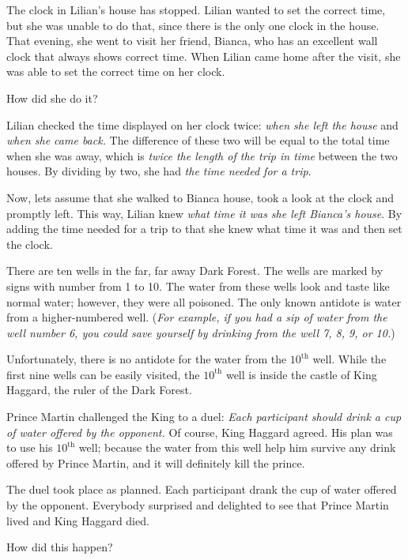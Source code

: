 \documentclass{article}
\begin{document}
\begin{example*}
    \label{example:pi-2022-4-p3}
    The clock in Lilian's house has stopped. Lilian wanted to set the correct time,
    but she was unable to do that, since there is the only one clock in the house.
    That evening, she went to visit her friend, Bianca,
    who has an excellent wall clock that always shows correct time.
    When Lilian came home after the visit, she was able to set the correct time on her clock.

    How did she do it?
\end{example*}

\begin{soln} 
    Lilian checked the time displayed on her clock twice: \textit{when she left the house} and \textit{when she came back.}
    The difference of these two will be equal to the total time when she was away,
    which is \textit{twice the length of the trip in time} between the two houses.
    By dividing by two, she had \textit{the time needed for a trip}. 

    Now, lets assume that she walked to Bianca house, took a look at the clock and promptly left.
    This way, Lilian knew \textit{what time it was she left Bianca's house}.
    By adding the time needed for a trip to that she knew what time it was and then set the clock.
\end{soln}

\begin{example*}
    \label{example:pi-2022-4-p4}
    There are ten wells in the far, far away Dark Forest.
    The wells are marked by signs with number from 1 to 10.
    The water from these wells look and taste like normal water;
    however, they were all poisoned.
    The only known antidote is water from a higher-numbered well.
    (\textit{For example, if you had a sip of water from the well number 6,
    you could save yourself by drinking from the well 7, 8, 9, or 10.})

    Unfortunately, there is no antidote for the water from the $10^{\text{th}}$ well.
    While the first nine wells can be easily visited,
    the $10^{\text{th}}$ well is inside the castle of King Haggard, the ruler of the Dark Forest.
    
    Prince Martin challenged the King to a duel:
    \textit{Each participant should drink a cup of water offered by the opponent.}
    Of course, King Haggard agreed. His plan was to use his $10^{\text{th}}$ well;
    because the water from this well help him survive any drink offered by Prince Martin,
    and it will definitely kill the prince.

    The duel took place as planned. Each participant drank the cup of water offered by the opponent.
    Everybody surprised and delighted to see that Prince Martin lived and King Haggard died.
    
    How did this happen?
\end{example*}
\end{document}
